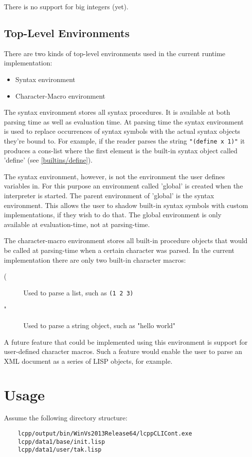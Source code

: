 \documentclass[a4paper]{scrartcl}
\begin{document}
	There is no support for big integers (yet).
	
\subsection{Top-Level Environments}
\label{env}
	There are two kinds of top-level environments used in the current runtime implementation:
	\begin{itemize}
		\item Syntax environment
		\item Character-Macro environment
	\end{itemize}

	The syntax environment stores all syntax procedures. It is available at both parsing time as well as evaluation time. At parsing time the syntax environment is used to replace occurrences of syntax symbols with the actual syntax objects they're bound to. For example, if the reader parses the string \lstinline|"(define x 1)"| it produces a cons-list where the first element is the built-in syntax object called 'define' (see \ref{builtins/define}).

	The syntax environment, however, is not the environment the user defines variables in. For this purpose an environment called 'global' is created when the interpreter is started. The parent environment of 'global' is the syntax environment. This allows the user to shadow built-in syntax symbols with custom implementations, if they wish to do that. The global environment is only available at evaluation-time, not at parsing-time.

	The character-macro environment stores all built-in procedure objects that would be called at parsing-time when a certain character was parsed. In the current implementation there are only two built-in character macros:
	\begin{description}
		\item[(] Used to parse a list, such as \lstinline|(1 2 3)|
		\item["] Used to parse a string object, such as "hello world"
	\end{description}

	A future feature that could be implemented using this environment is support for user-defined character macros. Such a feature would enable the user to parse an XML document as a series of LISP objects, for example.

\section{Usage}
\label{usage}
	Assume the following directory structure:
	\begin{lstlisting}
	lcpp/output/bin/WinVs2013Release64/lcppCLICont.exe
	lcpp/data1/base/init.lisp
	lcpp/data1/user/tak.lisp
	\end{lstlisting}
\end{document}
